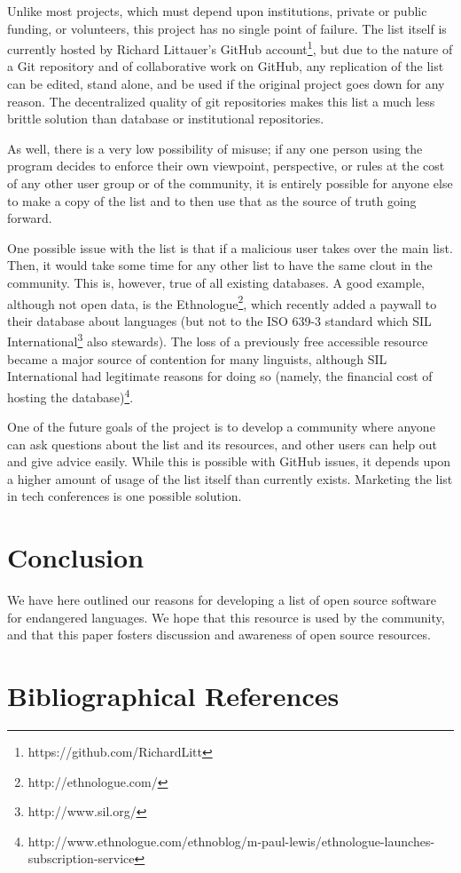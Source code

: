 \documentclass[10pt, a4paper]{article}
\begin{document}
Unlike most projects, which must depend upon institutions, private or public funding, or volunteers, this project has no single point of failure. The list itself is currently hosted by Richard Littauer's GitHub account\footnote{https://github.com/RichardLitt}, but due to the nature of a Git repository and of collaborative work on GitHub, any replication of the list can be edited, stand alone, and be used if the original project goes down for any reason. The decentralized quality of git repositories makes this list a much less brittle solution than database or institutional repositories. 

As well, there is a very low possibility of misuse; if any one person using the program decides to enforce their own viewpoint, perspective, or rules at the cost of any other user group or of the community, it is entirely possible for anyone else to make a copy of the list and to then use that as the source of truth going forward. 

One possible issue with the list is that if a malicious user takes over the main list. Then, it would take some time for any other list to have the same clout in the community. This is, however, true of all existing databases. A good example, although not open data, is the Ethnologue\footnote{http://ethnologue.com/}, which recently added a paywall to their database about languages (but not to the ISO 639-3 standard which SIL International\footnote{http://www.sil.org/} also stewards). The loss of a previously free accessible resource became a major source of contention for many linguists, although SIL International had legitimate reasons for doing so (namely, the financial cost of hosting the database)\footnote{http://www.ethnologue.com/ethnoblog/m-paul-lewis/ethnologue-launches-subscription-service}. 

One of the future goals of the project is to develop a community where anyone can ask questions about the list and its resources, and other users can help out and give advice easily. While this is possible with GitHub issues, it depends upon a higher amount of usage of the list itself than currently exists. Marketing the list in tech conferences is one possible solution. 

\section{Conclusion}

We have here outlined our reasons for developing a list of open source software for endangered languages. We hope that this resource is used by the community, and that this paper fosters discussion and awareness of open source resources. 

\section{Bibliographical References}
\label{main:ref}





\end{document}
